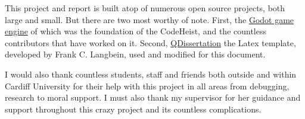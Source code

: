 %
%
%
%

This project and report is built atop of numerous open source projects, both large and small. But there are two most worthy of note. First, the  \href{https://godotengine.org/}{Godot game engine} of which was the foundation of the CodeHeist, and the countless contributors that have worked on it. Second, \href{https://qyber.black/tools/tex-qdissertation}{QDissertation} the Latex template, developed by Frank C. Langbein, used and modified for this document.

I would also thank countless students, staff and friends both outside and within Cardiff University for their help with this project in all areas from debugging, research to moral support. I must also thank my supervisor for her guidance and support throughout this crazy project and its countless complications.